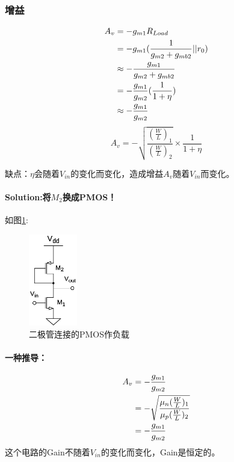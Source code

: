 \documentclass[twoside,a4paper,openright,titlepage,draft]{ctexrep}
\begin{document}
\subsubsection{增益}
\begin{align}
    A_v &= -g_{m1}R_{Load} \notag \\
    &= -g_{m1}(\frac{1}{g_{m2} + g_{mb2}} || r_0) \notag \\
    &\approx -\frac{g_{m1}}{g_{m2} + g_{mb2}} \notag \\
    &= -\frac{g_{m1}}{g_{m2}}(\frac{1}{1 + \eta}) \notag \\
    &\approx -\frac{g_{m1}}{g_{m2}}
\end{align}
\begin{equation}
    A_v = - \sqrt{\frac{(\frac{W}{L})_1}{(\frac{W}{L})_2}}\times \frac{1}{1 + \eta}
\end{equation} \par
缺点：$\eta$会随着$V_{in}$的变化而变化，造成增益$A_v$随着$V_{in}$而变化。\\

\paragraph{Solution:将$M_2$换成PMOS！\\}
如图\ref{fig:共源二极管连接的PMOS负载}:

\begin{multicols}{2}
    \begin{figure}[H]
        \centering
        \includegraphics[height=40mm]{diode-connectedpmos.eps}
        \caption{二极管连接的PMOS作负载}
        \label{fig:共源二极管连接的PMOS负载}
    \end{figure}
    \columnbreak
    \paragraph{一种推导：}
    \begin{align}
        A_v &= -\frac{g_{m1}}{g_{m2}} \notag \\
        &= -\sqrt{\frac{\mu_n (\frac{W}{L})_1}{\mu_p (\frac{W}{L})_2}} \notag \\
        &= -\frac{g_{m1}}{g_{m2}}
    \end{align}
    这个电路的Gain不随着$V_{in}$的变化而变化，Gain是恒定的。\\
\end{multicols}
\end{document}

